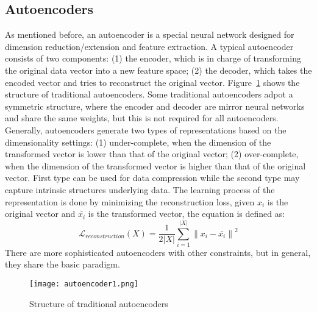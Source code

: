 \subsection{Autoencoders}
As mentioned before, an autoencoder is a special neural network designed for dimension reduction/extension and feature extraction. A typical autoencoder consists of two components: (1) the encoder, which is in charge of transforming the original data vector into a new feature space; (2) the decoder, which takes the encoded vector and tries to reconstruct the original vector. Figure~\ref{fig:autoencoder1} shows the structure of traditional autoencoders. Some traditional autoencoders adpot a symmetric structure, where the encoder and decoder are mirror neural networks and share the same weights, but this is not required for all autoencoders. Generally, autoencoders generate two types of representations based on the dimensionality settings: (1) under-complete, when the dimension of the transformed vector is lower than that of the original vector; (2) over-complete, when the dimension of the transformed vector is higher than that of the original vector. First type can be used for data compression while the second type may capture intrinsic structures underlying data. The learning process of the representation is done by minimizing the reconstruction loss, given $x_i$ is the original vector and $\bar{x_i}$ is the transformed vector, the equation is defined as:
\begin{equation}
    \mathcal{L}_{reconstruction}(X) = \frac{1}{2|X|}\sum_{i=1}^{|X|} \left\|x_i - \bar{x_i} \right\|^2
    \label{eq:reconstruction}
\end{equation}
There are more sophisticated autoencoders with other constraints, but in general, they share the basic paradigm.
\begin{figure}[!htbp]
    \centering
    \texttt{[image: autoencoder1.png]}
    \caption{Structure of traditional autoencoders}
    \label{fig:autoencoder1}
\end{figure} 

